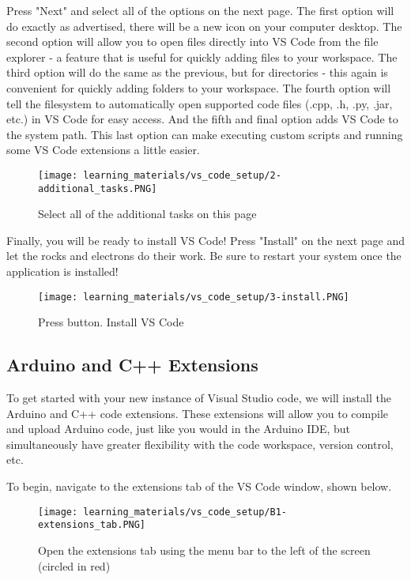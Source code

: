     Press "Next" and select all of the options on the next page.
    The first option will do exactly as advertised, there will be a new icon on your computer desktop.
    The second option will allow you to open files directly into VS Code from the file explorer - a feature that is useful for quickly adding files to your workspace.
    The third option will do the same as the previous, but for directories - this again is convenient for quickly adding folders to your workspace.
    The fourth option will tell the filesystem to automatically open supported code files (.cpp, .h, .py, .jar, etc.) in VS Code for easy access.
    And the fifth and final option adds VS Code to the system path.
    This last option can make executing custom scripts and running some VS Code extensions a little easier.

    \begin{figure}[h!]
        \texttt{[image: learning\_materials/vs\_code\_setup/2-additional\_tasks.PNG]}
        \caption[VS Code Additional Tasks]{Select all of the additional tasks on this page}
    \end{figure}

    Finally, you will be ready to install VS Code!
    Press "Install" on the next page and let the rocks and electrons do their work.
    Be sure to restart your system once the application is installed!

    \begin{figure}[h!]
        \texttt{[image: learning\_materials/vs\_code\_setup/3-install.PNG]}
        \caption[VS Code Install]{Press button. Install VS Code}
    \end{figure}

    \subsection*{Arduino and C++ Extensions}
    To get started with your new instance of Visual Studio code, we will install the Arduino and C++ code extensions.
    These extensions will allow you to compile and upload Arduino code, just like you would in the Arduino IDE, but simultaneously have greater flexibility with the code workspace, version control, etc.

    To begin, navigate to the extensions tab of the VS Code window, shown below.

    \begin{figure}[h!]
        \texttt{[image: learning\_materials/vs\_code\_setup/B1-extensions\_tab.PNG]}
        \caption[VS Code Extension Tab]{Open the extensions tab using the menu bar to the left of the screen (circled in red)}
    \end{figure}


